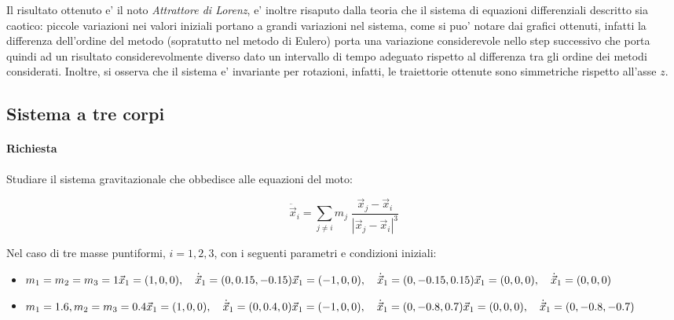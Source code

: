 Il risultato ottenuto e' il noto \textit{Attrattore di Lorenz}, e' inoltre risaputo dalla teoria che il sistema di equazioni differenziali descritto sia caotico: piccole variazioni nei valori iniziali portano a grandi variazioni nel sistema, come si puo' notare dai grafici ottenuti, infatti la differenza dell'ordine del metodo (sopratutto nel metodo di Eulero) porta una variazione considerevole nello step successivo che porta quindi ad un risultato considerevolmente diverso dato un intervallo di tempo adeguato rispetto al differenza tra gli ordine dei metodi considerati. Inoltre, si osserva che il sistema e' invariante per rotazioni, infatti, le traiettorie ottenute sono simmetriche rispetto all'asse $z$.


\subsection{Sistema a tre corpi}

\paragraph{Richiesta}

Studiare il sistema gravitazionale che obbedisce alle equazioni del moto:

\begin{equation}
	\ddot{\vec{x}}_i = \sum_{j \neq i} m_j \; \frac{ \vec{x}_j - \vec{x}_i}{|\vec{x}_j - \vec{x}_i|^3}
	\label{eq:3body}
\end{equation}

Nel caso di tre masse puntiformi, $i = 1, 2, 3$, con i seguenti parametri e condizioni iniziali:

\begin{itemize}
	\item
	      \quad\parbox{\linewidth}{
		      \begin{math}
			      m_1 = m_2 = m_3 = 1 \\
			      \vec{x}_1 = (1, 0, 0), \quad \dot{\vec{x}}_1 = (0, 0.15, -0.15) \\
			      \vec{x}_1 = (-1, 0, 0), \quad \dot{\vec{x}}_1 = (0, -0.15, 0.15) \\
			      \vec{x}_1 = (0, 0, 0), \quad \dot{\vec{x}}_1 = (0, 0, 0)
		      \end{math}
		      \\
	      }
	\item
	      \quad\parbox{\linewidth}{
		      \begin{math}
			      m_1 = 1.6, m_2 = m_3 = 0.4 \\
			      \vec{x}_1 = (1, 0, 0), \quad \dot{\vec{x}}_1 = (0, 0.4, 0) \\
			      \vec{x}_1 = (-1, 0, 0), \quad \dot{\vec{x}}_1 = (0, -0.8, 0.7) \\
			      \vec{x}_1 = (0, 0, 0), \quad \dot{\vec{x}}_1 = (0, -0.8, -0.7)
		      \end{math}
	      }
\end{itemize}


